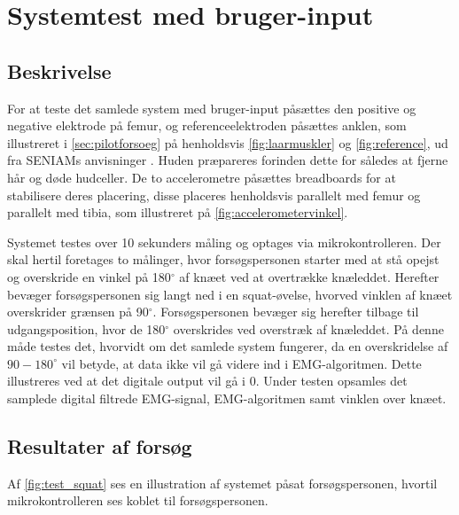 \section{Systemtest med bruger-input}

\subsection{Beskrivelse}
For at teste det samlede system med bruger-input påsættes den positive og negative elektrode på femur, og referenceelektroden påsættes anklen, som illustreret i \autoref{sec:pilotforsoeg} på henholdsvis \autoref{fig:laarmuskler} og \autoref{fig:reference}, ud fra SENIAMs anvisninger \citep{seniam2016}. Huden præpareres forinden dette for således at fjerne hår og døde hudceller. 
De to accelerometre påsættes breadboards for at stabilisere deres placering, disse placeres henholdsvis parallelt med femur og parallelt med tibia, som illustreret på \autoref{fig:accelerometervinkel}.

Systemet testes over 10 sekunders måling og optages via mikrokontrolleren. Der skal hertil foretages to målinger, hvor forsøgspersonen starter med at stå opejst og overskride en vinkel på 180$^{\circ}$ af knæet ved at overtrække knæleddet. Herefter bevæger forsøgspersonen sig langt ned i en squat-øvelse, hvorved vinklen af knæet overskrider grænsen på 90$^{\circ}$. Forsøgspersonen bevæger sig herefter tilbage til udgangsposition, hvor de 180$^{\circ}$ overskrides ved overstræk af knæleddet.
På denne måde testes det, hvorvidt om det samlede system fungerer, da en overskridelse af $90-180^{\circ}$ vil betyde, at data ikke vil gå videre ind i EMG-algoritmen. Dette illustreres ved at det digitale output vil gå i 0. Under testen opsamles det samplede digital filtrede EMG-signal, EMG-algoritmen samt vinklen over knæet.

\subsection{Resultater af forsøg}

Af \ref{fig:test_squat} ses en illustration af systemet påsat forsøgspersonen, hvortil mikrokontrolleren ses koblet til forsøgspersonen.

